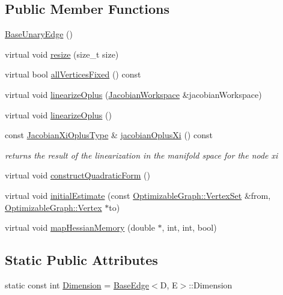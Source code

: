 \subsection*{Public Member Functions}
\begin{DoxyCompactItemize}
\item 
\mbox{\hyperlink{classg2o_1_1_base_unary_edge_a7375d1ebfb57ba0308f863739b817b15}{Base\+Unary\+Edge}} ()
\item 
virtual void \mbox{\hyperlink{classg2o_1_1_base_unary_edge_a01fcdfd2d3ed0325655bb99db95c0b10}{resize}} (size\+\_\+t size)
\item 
virtual bool \mbox{\hyperlink{classg2o_1_1_base_unary_edge_a4c5ec31144a266fb059b73b2387456c1}{all\+Vertices\+Fixed}} () const
\item 
virtual void \mbox{\hyperlink{classg2o_1_1_base_unary_edge_a8b396647b5b438d30a04758023baa595}{linearize\+Oplus}} (\mbox{\hyperlink{classg2o_1_1_jacobian_workspace}{Jacobian\+Workspace}} \&jacobian\+Workspace)
\item 
virtual void \mbox{\hyperlink{classg2o_1_1_base_unary_edge_a367f19b903938faf6e89dd1b0e4e722b}{linearize\+Oplus}} ()
\item 
const \mbox{\hyperlink{classg2o_1_1_base_unary_edge_a24bcabd661223e15b7337f2835310f5e}{Jacobian\+Xi\+Oplus\+Type}} \& \mbox{\hyperlink{classg2o_1_1_base_unary_edge_a396fbab83bfc9ce2e2080b16ccc357f4}{jacobian\+Oplus\+Xi}} () const
\begin{DoxyCompactList}\small\item\em returns the result of the linearization in the manifold space for the node xi \end{DoxyCompactList}\item 
virtual void \mbox{\hyperlink{classg2o_1_1_base_unary_edge_ad7e6dc44c571be159f066bdb961ade2b}{construct\+Quadratic\+Form}} ()
\item 
virtual void \mbox{\hyperlink{classg2o_1_1_base_unary_edge_a3d3311901116092cf817b094f6a0b44b}{initial\+Estimate}} (const \mbox{\hyperlink{classg2o_1_1_hyper_graph_a703938cdb4bb636860eed55a2489d70c}{Optimizable\+Graph\+::\+Vertex\+Set}} \&from, \mbox{\hyperlink{classg2o_1_1_optimizable_graph_1_1_vertex}{Optimizable\+Graph\+::\+Vertex}} $\ast$to)
\item 
virtual void \mbox{\hyperlink{classg2o_1_1_base_unary_edge_a919dcb89130f6e7082e807530facdd78}{map\+Hessian\+Memory}} (double $\ast$, int, int, bool)
\end{DoxyCompactItemize}
\subsection*{Static Public Attributes}
\begin{DoxyCompactItemize}
\item 
static const int \mbox{\hyperlink{classg2o_1_1_base_unary_edge_a4e584cf552998a34948d8d5b484f7fd3}{Dimension}} = \mbox{\hyperlink{classg2o_1_1_base_edge}{Base\+Edge}}$<$D, E$>$\+::Dimension
\end{DoxyCompactItemize}
